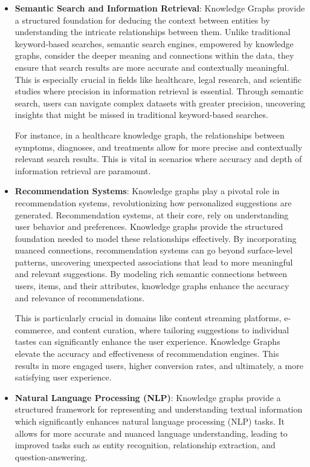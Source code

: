 \begin{itemize}
    \item \textbf{Semantic Search and Information Retrieval}:
    Knowledge Graphs provide a structured foundation for deducing the context between entities by understanding the intricate relationships between them. Unlike traditional keyword-based searches, semantic search engines, empowered by knowledge graphs, consider the deeper meaning and connections within the data, they ensure that search results are more accurate and contextually meaningful. This is especially crucial in fields like healthcare, legal research, and scientific studies where precision in information retrieval is essential. Through semantic search, users can navigate complex datasets with greater precision, uncovering insights that might be missed in traditional keyword-based searches.

    For instance, in a healthcare knowledge graph, the relationships between symptoms, diagnoses, and treatments allow for more precise and contextually relevant search results. This is vital in scenarios where accuracy and depth of information retrieval are paramount.

    
    \item \textbf{Recommendation Systems}:
    Knowledge graphs play a pivotal role in recommendation systems, revolutionizing how personalized suggestions are generated. Recommendation systems, at their core, rely on understanding user behavior and preferences. Knowledge graphs provide the structured foundation needed to model these relationships effectively. By incorporating nuanced connections, recommendation systems can go beyond surface-level patterns, uncovering unexpected associations that lead to more meaningful and relevant suggestions. By modeling rich semantic connections between users, items, and their attributes, knowledge graphs enhance the accuracy and relevance of recommendations. 
    
    This is particularly crucial in domains like content streaming platforms, e-commerce, and content curation, where tailoring suggestions to individual tastes can significantly enhance the user experience. Knowledge Graphs elevate the accuracy and effectiveness of recommendation engines. This results in more engaged users, higher conversion rates, and ultimately, a more satisfying user experience.

    \item \textbf{Natural Language Processing (NLP)}:
    Knowledge graphs provide a structured framework for representing and understanding textual information which significantly enhances natural language processing (NLP) tasks. It allows for more accurate and nuanced language understanding, leading to improved tasks such as entity recognition, relationship extraction, and question-answering.


\end{itemize}
